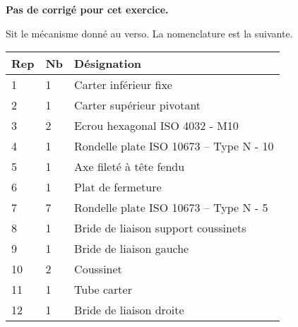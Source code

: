 \normalfalse \difficiletrue \tdifficilefalse
\correctionfalse

\setcounter{numques}{0}

\ifcorrection
\else
\textbf{Pas de corrigé pour cet exercice.}
\fi

\ifprof
\else
Sit le mécanisme donné au verso.
\fi
La nomenclature est la suivante. 
\begin{multicols}{2}
\begin{center}
\begin{tabular}{|l|l|l|}
\hline
Rep & Nb  & Désignation \\ \hline \hline %
1 & 1 & Carter inférieur fixe  \\ \hline %
2&
1&
Carter supérieur pivotant\\ \hline %
3&
2 &
Ecrou hexagonal ISO 4032 - M10 \\ \hline %
4&
1&
Rondelle plate ISO 10673 – Type N - 10 \\ \hline %
5&
1&
Axe fileté à tête fendu \\ \hline %
6&
1&
Plat de fermeture%
\\ \hline %
7&
7&
Rondelle plate ISO 10673 -- Type N - 5 \\ \hline %
8&
1&
Bride de liaison support coussinets \\ \hline %
9&
1&
Bride de liaison gauche \\ \hline %
10&
2&
Coussinet \\ \hline %
11&
1&
Tube carter \\ \hline %
12&
1&
Bride de liaison droite \\ \hline %

\end{tabular}
\end{center}
\end{multicols}
